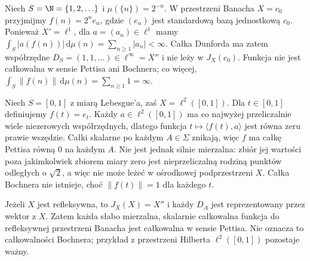 \begin{przyklad}
\label{ex:dunford-not-pettis15b}
Niech $S=\N=\{1,2,\ldots\}$ i
$\mu(\{n\})=2^{-n}$. W przestrzeni Banacha $X=c_0$
przyjmijmy $f(n)=2^ne_n$, gdzie $(e_n)$ jest standardową
bazą jednostkową $c_0$. Ponieważ $X'=\ell^1$, dla
$a=(a_n)\in\ell^1$ mamy
$\int_S|a(f(n))|\,\mathrm d\mu(n)
=\sum_{n\ge1}|a_n|<\infty$.
Całka Dunforda ma zatem współrzędne
$D_S=(1,1,\ldots)\in\ell^\infty=X''$ i nie leży w
$J_X(c_0)$. Funkcja nie jest całkowalna w sensie Pettisa
ani Bochnera; co więcej,
$\int_S\|f(n)\|\,\mathrm d\mu(n)=\sum_{n\ge1}1=\infty$.
\end{przyklad}

\begin{przyklad}
\label{ex:pettis-not-bochner15b}
Niech $S=[0,1]$ z miarą Lebesgue'a, zaś
$X=\ell^2([0,1])$. Dla $t\in[0,1]$ definiujemy $f(t)=e_t$.
Każdy $a\in\ell^2([0,1])$ ma co najwyżej przeliczalnie
wiele niezerowych współrzędnych, dlatego funkcja
$t\mapsto\langle f(t),a\rangle$ jest równa zeru prawie
wszędzie. Całki skalarne po każdym $A\in\Sigma$ znikają,
więc $f$ ma całkę Pettisa równą $0$ na każdym $A$.
Nie jest jednak silnie mierzalna: zbiór jej wartości poza
jakimkolwiek zbiorem miary zero jest nieprzeliczalną rodziną
punktów odległych o $\sqrt 2$, a więc nie może leżeć
w ośrodkowej podprzestrzeni $X$. Całka Bochnera nie istnieje,
choć $\|f(t)\|=1$ dla każdego $t$.
\end{przyklad}

\begin{uwaga}
Jeżeli $X$ jest refleksywna, to $J_X(X)=X''$ i każdy
$D_A$ jest reprezentowany przez wektor z $X$. Zatem każda
słabo mierzalna, skalarnie całkowalna funkcja do refleksywnej
przestrzeni Banacha jest całkowalna w sensie Pettisa.
Nie oznacza to całkowalności Bochnera; przykład z
przestrzeni Hilberta $\ell^2([0,1])$ pozostaje ważny.
\end{uwaga}

